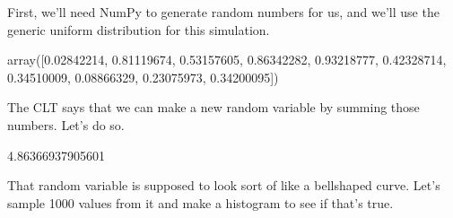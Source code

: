 \documentclass[letterpaper,10pt,english]{sphinxmanual}
\begin{document}
First, we’ll need NumPy to generate random numbers for us, and we’ll use the generic uniform distribution for this simulation.

\begin{sphinxVerbatim}[commandchars=\\\{\}]
   
    
\end{sphinxVerbatim}

\begin{sphinxVerbatim}[commandchars=\\\{\}]
array([0.02842214, 0.81119674, 0.53157605, 0.86342282, 0.93218777,
       0.42328714, 0.34510009, 0.08866329, 0.23075973, 0.34200095])
\end{sphinxVerbatim}

The CLT says that we can make a new random variable by summing those numbers.  Let’s do so.

\begin{sphinxVerbatim}[commandchars=\\\{\}]
  
       

  
\end{sphinxVerbatim}

\begin{sphinxVerbatim}[commandchars=\\\{\}]
4.86366937905601
\end{sphinxVerbatim}

That random variable is supposed to look sort of like a bell\sphinxhyphen{}shaped curve.  Let’s sample 1000 values from it and make a histogram to see if that’s true.

\begin{sphinxVerbatim}[commandchars=\\\{\}]
   
  \PYG{p}{[}      \PYG{p}{]}
   
\end{sphinxVerbatim}
\end{document}
